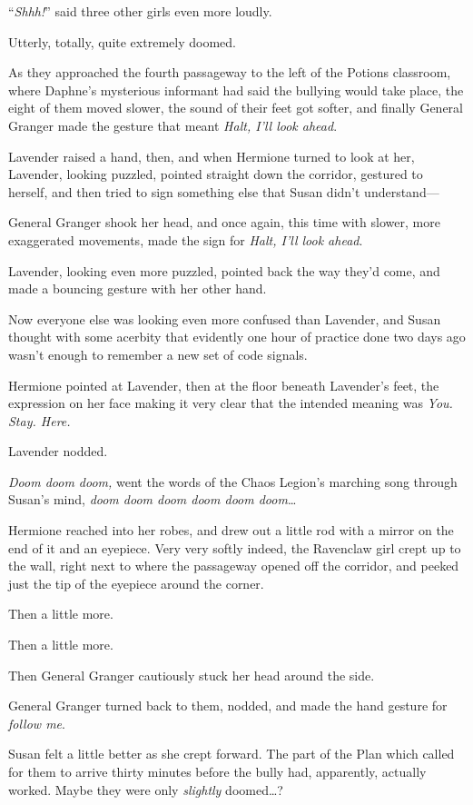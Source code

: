 “\emph{Shhh!}” said three other girls even more loudly.

Utterly, totally, quite extremely doomed.

As they approached the fourth passageway to the left of the Potions classroom, where Daphne’s mysterious informant had said the bullying would take place, the eight of them moved slower, the sound of their feet got softer, and finally General Granger made the gesture that meant \emph{Halt, I’ll look ahead}.

Lavender raised a hand, then, and when Hermione turned to look at her, Lavender, looking puzzled, pointed straight down the corridor, gestured to herself, and then tried to sign something else that Susan didn’t understand—

General Granger shook her head, and once again, this time with slower, more exaggerated movements, made the sign for \emph{Halt, I’ll look ahead}.

Lavender, looking even more puzzled, pointed back the way they’d come, and made a bouncing gesture with her other hand.

Now everyone else was looking even more confused than Lavender, and Susan thought with some acerbity that evidently one hour of practice done two days ago wasn’t enough to remember a new set of code signals.

Hermione pointed at Lavender, then at the floor beneath Lavender’s feet, the expression on her face making it very clear that the intended meaning was \emph{You. Stay. Here.}

Lavender nodded.

\emph{Doom doom doom,} went the words of the Chaos Legion’s marching song through Susan’s mind, \emph{doom doom doom doom doom doom}…

Hermione reached into her robes, and drew out a little rod with a mirror on the end of it and an eyepiece. Very very softly indeed, the Ravenclaw girl crept up to the wall, right next to where the passageway opened off the corridor, and peeked just the tip of the eyepiece around the corner.

Then a little more.

Then a little more.

Then General Granger cautiously stuck her head around the side.

General Granger turned back to them, nodded, and made the hand gesture for \emph{follow me}.

Susan felt a little better as she crept forward. The part of the Plan which called for them to arrive thirty minutes before the bully had, apparently, actually worked. Maybe they were only \emph{slightly} doomed…?

